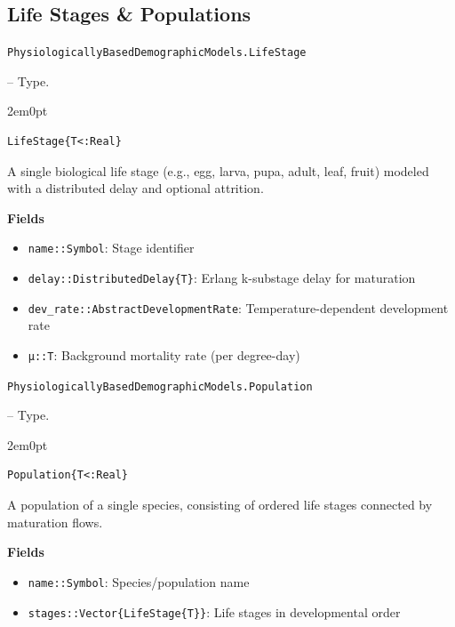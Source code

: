 \subsection{Life Stages \& Populations}



\label{10518975884970436834}{}

\hypertarget{6142953013525616752}{\texttt{PhysiologicallyBasedDemographicModels.LifeStage}}  -- {Type.}

\begin{adjustwidth}{2em}{0pt}


\begin{verbatim}
LifeStage{T<:Real}
\end{verbatim}

A single biological life stage (e.g., egg, larva, pupa, adult, leaf, fruit) modeled with a distributed delay and optional attrition.

\textbf{Fields}

\begin{itemize}
\item \texttt{name::Symbol}: Stage identifier


\item \texttt{delay::DistributedDelay\{T\}}: Erlang k-substage delay for maturation


\item \texttt{dev\_rate::AbstractDevelopmentRate}: Temperature-dependent development rate


\item \texttt{μ::T}: Background mortality rate (per degree-day)

\end{itemize}


\end{adjustwidth}
\hypertarget{8407409779568978052}{\texttt{PhysiologicallyBasedDemographicModels.Population}}  -- {Type.}

\begin{adjustwidth}{2em}{0pt}


\begin{verbatim}
Population{T<:Real}
\end{verbatim}

A population of a single species, consisting of ordered life stages connected by maturation flows.

\textbf{Fields}

\begin{itemize}
\item \texttt{name::Symbol}: Species/population name


\item \texttt{stages::Vector\{LifeStage\{T\}\}}: Life stages in developmental order

\end{itemize}


\end{adjustwidth}

